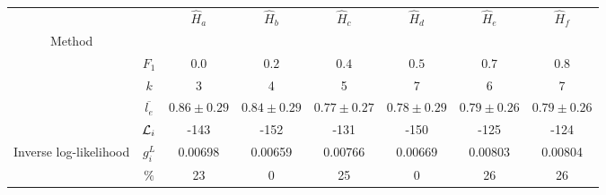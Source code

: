 \begin{tabular}{|cc|c|c|c|c|c|c|}
\hline
          &      &                              $\hat{H}_a$ &                              $\hat{H}_b$ &                              $\hat{H}_c$ &                              $\hat{H}_d$ &                              $\hat{H}_e$ &                              $\hat{H}_f$ \\
Method &  &                                          &                                          &                                          &                                          &                                          &                                          \\

          & $F_1$ &                                    $0.0$ &                                    $0.2$ &                                    $0.4$ &                                    $0.5$ &                                    $0.7$ &                                    $0.8$ \\
          & $k$ &                                        3 &                                        4 &                                        5 &                                        7 &                                        6 &                                        7 \\
          & $\overline{l_e}$ &                          $0.86 \pm 0.29$ &                          $0.84 \pm 0.29$ &                          $0.77 \pm 0.27$ &                          $0.78 \pm 0.29$ &                          $0.79 \pm 0.26$ &                          $0.79 \pm 0.26$ \\
          & ${\mathcal{L}}_i$ &                                     -143 &                                     -152 &                                     -131 &                                     -150 &                                     -125 &                                     -124 \\
\hline \multirow{2}{*}{Inverse log-likelihood} & $g_i^L$ &                                  0.00698 &                                  0.00659 &                                  0.00766 &                                  0.00669 &                                  0.00803 &                                  0.00804 \\
          & $\%$ &                                       23 &                                        0 &                                       25 &                                        0 &                                       26 &                                       26 \\

\end{tabular}
